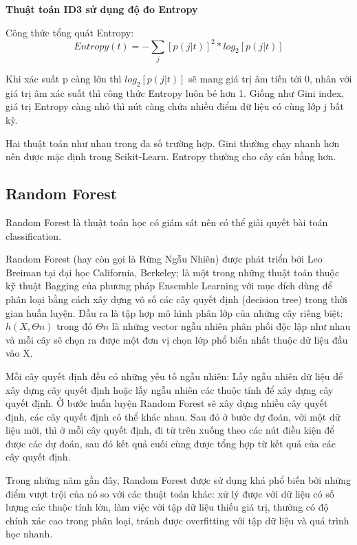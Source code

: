 \documentclass[12pt,a4paper,oneside]{book}
\begin{document}
		\textbf{Thuật toán ID3 sử dụng độ đo Entropy}
		
		Công thức tổng quát Entropy:
		\begin{equation}
			Entropy(t) = - \sum_{j} [p(j|t)]^2 * log_{2}[p(j|t)] 
		\end{equation}
	
		Khi xác suất p càng lớn thì $log_{2}[p(j|t)]$ sẽ mang giá trị âm tiến tới 0, nhân với giá trị âm xác suất thì công thức Entropy luôn bé hơn 1. Giống như Gini index, giá trị Entropy càng nhỏ thì nút càng chứa nhiều điểm dữ liệu có cùng lớp j bất kỳ.
		
		Hai thuật toán như nhau trong đa số trường hợp. Gini thường chạy nhanh hơn nên được mặc định trong Scikit-Learn. Entropy thường cho cây cân bằng hơn.
			
		\subsection{Random Forest}
		Random Forest là thuật toán học có giám sát nên có thể giải quyết bài toán classification.
		
		Random Forest (hay còn gọi là Rừng Ngẫu Nhiên)  được phát triển bởi Leo Breiman tại đại học California, Berkeley; là một trong những thuật toán thuộc kỹ thuật Bagging của phương pháp Ensemble Learning với mục đích dùng để phân loại bằng cách xây dựng vô số các cây quyết định (decision tree) trong thời gian huấn luyện. Đầu ra là tập hợp mô hình phân lớp của những cây riêng biệt:
		${h(X, \Theta n)}$ trong đó $\Theta n$ là những vector ngẫu nhiên phân phối độc lập như nhau và mỗi cây sẽ chọn ra được một đơn vị chọn lớp phổ biến nhất thuộc dữ liệu đầu vào X.
		
		Mỗi cây quyết định đều có những yếu tố ngẫu nhiên: Lấy ngẫu nhiên dữ liệu để xây dựng cây quyết định hoặc lấy ngẫu nhiên các thuộc tính để xây dựng cây quyết định.
		Ở bước huấn luyện Random Forest sẽ xây dựng nhiều cây quyết định, các cây quyết định có thể khác nhau. Sau đó ở bước dự đoán, với một dữ liệu mới, thì ở mỗi cây quyết định, đi từ trên xuống theo các nút điều kiện để được các dự đoán, sau đó kết quả cuối cùng được tổng hợp từ kết quả của các cây quyết định.
		
		Trong những năm gần đây, Random Forest được sử dụng khá phổ biến bởi những điểm vượt trội của nó so với các thuật toán khác: xử lý được với dữ liệu có số lượng các thuộc tính lớn, làm việc với tập dữ liệu thiếu giá trị, thường có độ chính xác cao trong phân loại, tránh được overfitting với tập dữ liệu và quá trình học nhanh.
		
\end{document}
